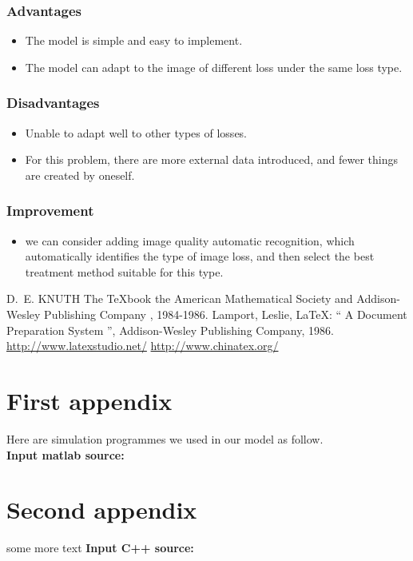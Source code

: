 \documentclass{mcmthesis}
\begin{document}
\subsubsection{Advantages}
\begin{itemize}
  \item The model is simple and easy to implement.
  \item The model can adapt to the image of different loss under the same loss type.
\end{itemize}

\subsubsection{Disadvantages}
\begin{itemize}
  \item Unable to adapt well to other types of losses.
  \item For this problem, there are more external data introduced, and fewer things are created by oneself.
\end{itemize}

\subsubsection{Improvement}
\begin{itemize}
  \item we can consider adding image quality automatic recognition, which automatically identifies the type of image loss, and then select the best treatment method suitable for this type.
\end{itemize}

\begin{thebibliography}{99}
 D.~E. KNUTH   The \TeX{}book  the American
Mathematical Society and Addison-Wesley
Publishing Company , 1984-1986.
Lamport, Leslie,  \LaTeX{}: `` A Document Preparation System '',
Addison-Wesley Publishing Company, 1986.
\url{http://www.latexstudio.net/}
\url{http://www.chinatex.org/}
\end{thebibliography}

\begin{appendices}

\section{First appendix}

\lipsum[13]

Here are simulation programmes we used in our model as follow.\\

\textbf{\textcolor[rgb]{0.98,0.00,0.00}{Input matlab source:}}


\section{Second appendix}

some more text \textcolor[rgb]{0.98,0.00,0.00}{\textbf{Input C++ source:}}


\end{appendices}
\end{document}
